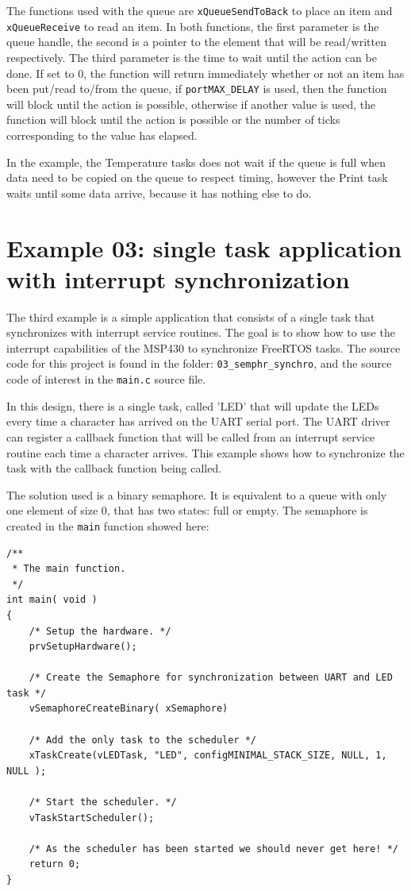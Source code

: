 \documentclass[11pt]{report}
\begin{document}
The functions used with the queue are \verb$xQueueSendToBack$ to place an item and \verb$xQueueReceive$ to read an item. In both functions, the first parameter is the queue handle, the second is a pointer to the element that will be read/written respectively. The third parameter is the time to wait until the action can be done. If set to 0, the function will return immediately whether or not an item has been put/read to/from the queue, if \verb$portMAX_DELAY$ is used, then the function will block until the action is possible, otherwise if another value is used, the function will block until the action is possible or the number of ticks corresponding to the value has elapsed.

In the example, the Temperature tasks does not wait if the queue is full when data need to be copied on the queue to respect timing, however the Print task waits until some data arrive, because it has nothing else to do.

\section{Example 03: single task application with interrupt synchronization}

The third example is a simple application that consists of a single task that synchronizes with interrupt service routines. The goal is to show how to use the interrupt capabilities of the MSP430 to synchronize FreeRTOS tasks. The source code for this project is found in the folder: \verb$03_semphr_synchro$, and the source code of interest in the \verb$main.c$ source file.

In this design, there is a single task, called 'LED' that will update the LEDs every time a character has arrived on the UART serial port. The UART driver can register a callback function that will be called from an interrupt service routine each time a character arrives. This example shows how to synchronize the task with the callback function being called.

The solution used is a binary semaphore. It is equivalent to a queue with only one element of size 0, that has two states: full or empty. The semaphore is created in the \verb$main$ function showed here:
\begin{verbatim}
/**
 * The main function.
 */
int main( void )
{
    /* Setup the hardware. */
    prvSetupHardware();
    
    /* Create the Semaphore for synchronization between UART and LED task */
    vSemaphoreCreateBinary( xSemaphore)
    
    /* Add the only task to the scheduler */
    xTaskCreate(vLEDTask, "LED", configMINIMAL_STACK_SIZE, NULL, 1, NULL );
    
    /* Start the scheduler. */
    vTaskStartScheduler();
    
    /* As the scheduler has been started we should never get here! */
    return 0;
}
\end{verbatim}
\end{document}
